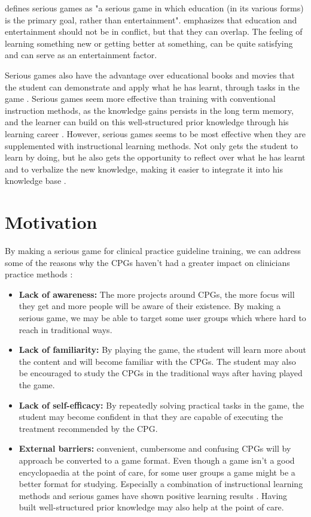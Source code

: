 \textcite{Michael2006} defines serious games as "a serious game in which education (in its various forms) is the primary goal, rather than entertainment". \textcite{Michael2006} emphasizes that education and entertainment should not be in conflict, but that they can overlap. The feeling of learning something new or getting better at something, can be quite satisfying and can serve as an entertainment factor.

Serious games also have the advantage over educational books and movies that the student can demonstrate and apply what he has learnt, through tasks in the game \parencite{Michael2006}.    Serious games seem more effective than training with conventional instruction methods, as the knowledge gains persists in the long term memory, and the learner can build on this well-structured prior knowledge through his learning career \parencite{Wouters2013}. However, serious games seems to be most effective when they are supplemented with instructional learning methods. Not only gets the student to learn by doing, but he also gets the opportunity to reflect over what he has learnt and to verbalize the new knowledge, making it easier to integrate it into his knowledge base \parencite{Wouters2013}. 





\section{Motivation}
By making a serious game for clinical practice guideline training, we can address some of the reasons why the CPGs haven't had a greater impact on clinicians practice methods \parencite{Cabana1999}:
\begin{itemize}
	\item \textbf{Lack of awareness:} The more projects around CPGs, the more focus will they get and more people will be aware of their existence. By making a serious game, we may be able to target some user groups which where hard to reach in traditional ways. 
	\item \textbf{Lack of familiarity:} By playing the game, the student will learn more about the content and will become familiar with the CPGs. The student may also be encouraged to study the CPGs in the traditional ways after having played the game.  
	\item \textbf{Lack of self-efficacy:} By repeatedly solving practical tasks in the game, the student may become confident in that they are capable of executing the treatment recommended by the CPG.
	\item \textbf{External barriers:} convenient, cumbersome and confusing CPGs will by approach be converted to a game format. Even though a game isn't a good encyclopaedia at the point of care, for some user groups a game might be a better format for studying. Especially a combination of instructional learning methods and serious games have shown positive learning results \parencite{Wouters2013}. Having built well-structured prior knowledge may also help at the point of care.
\end{itemize}

